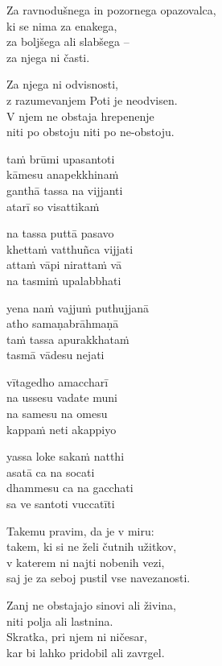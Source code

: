 Za ravnodušnega in pozornega opazovalca,\\
ki se nima za enakega,\\
za boljšega ali slabšega --\\
za njega ni časti.

Za njega ni odvisnosti,\\
z razumevanjem Poti je neodvisen.\\
V njem ne obstaja hrepenenje\\
niti po obstoju niti po ne-obstoju.


\clearpage

taṁ brūmi upasantoti\\
kāmesu anapekkhinaṁ\\
ganthā tassa na vijjanti\\
atarī so visattikaṁ

na tassa puttā pasavo\\
khettaṁ vatthuñca vijjati\\
attaṁ vāpi nirattaṁ vā\\
na tasmiṁ upalabbhati

yena naṁ vajjuṁ puthujjanā\\
atho samaṇabrāhmaṇā\\
taṁ tassa apurakkhataṁ\\
tasmā vādesu nejati

vītagedho amaccharī\\
na ussesu vadate muni\\
na samesu na omesu\\
kappaṁ neti akappiyo

yassa loke sakaṁ natthi\\
asatā ca na socati\\
dhammesu ca na gacchati\\
sa ve santoti vuccatīti


\clearpage

Takemu pravim, da je v miru:\\
takem, ki si ne želi čutnih užitkov,\\
v katerem ni najti nobenih vezi,\\
saj je za seboj pustil vse navezanosti.

Zanj ne obstajajo sinovi ali živina,\\
niti polja ali lastnina.\\
Skratka, pri njem ni ničesar,\\
kar bi lahko pridobil ali zavrgel.

